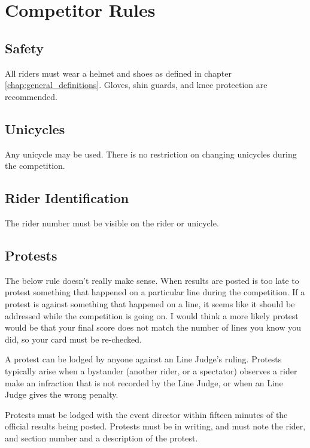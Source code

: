 \chapter{Competitor Rules}

\section{Safety}

All riders must wear a helmet and shoes as defined in chapter \ref{chap:general_definitions}.
Gloves, shin guards, and knee protection are recommended.

\section{Unicycles}

Any unicycle may be used.
There is no restriction on changing unicycles during the competition.

\section{Rider Identification}

The rider number must be visible on the rider or unicycle.

\section{Protests}

\begin{comment2016}
The below rule doesn't really make sense.
When results are posted is too late to protest something that happened on a particular line during the competition.
If a protest is against something that happened on a line, it seems like it should be addressed while the competition is going on.
I would think a more likely protest would be that your final score does not match the number of lines you know you did, so your card must be re-checked.
\end{comment2016}

A protest can be lodged by anyone against an Line Judge's ruling.
Protests typically arise when a bystander (another rider, or a spectator) observes a rider make an infraction that is not recorded by the Line Judge, or when an Line Judge gives the wrong penalty.

Protests must be lodged with the event director within fifteen minutes of the official results being posted.
Protests must be in writing, and must note the rider, and section number and a description of the protest.

